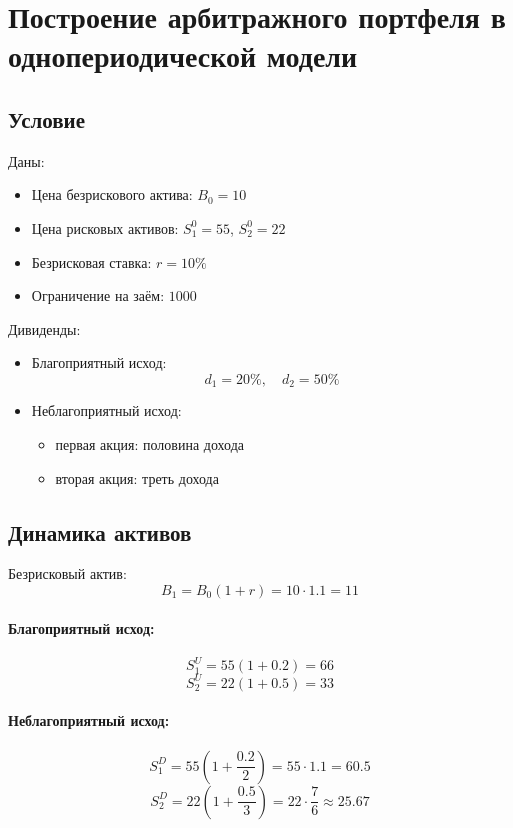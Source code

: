 \section*{Построение арбитражного портфеля в однопериодической модели}

\subsection*{Условие}

Даны:
\begin{itemize}
    \item Цена безрискового актива: $B_0 = 10$
    \item Цена рисковых активов: $S_1^0 = 55$, $S_2^0 = 22$
    \item Безрисковая ставка: $r = 10\%$
    \item Ограничение на заём: $1000$
\end{itemize}

Дивиденды:
\begin{itemize}
    \item Благоприятный исход:
    \[
    d_1 = 20\%, \quad d_2 = 50\%
    \]
    \item Неблагоприятный исход:
    \begin{itemize}
        \item первая акция: половина дохода
        \item вторая акция: треть дохода
    \end{itemize}
\end{itemize}

\subsection*{Динамика активов}

Безрисковый актив:
\[
B_1 = B_0(1+r) = 10 \cdot 1.1 = 11
\]

\paragraph{Благоприятный исход:}
\[
S_1^U = 55(1+0.2) = 66
\]
\[
S_2^U = 22(1+0.5) = 33
\]

\paragraph{Неблагоприятный исход:}
\[
S_1^D = 55\left(1+\frac{0.2}{2}\right) = 55 \cdot 1.1 = 60.5
\]
\[
S_2^D = 22\left(1+\frac{0.5}{3}\right) = 22 \cdot \frac{7}{6} \approx 25.67
\]

